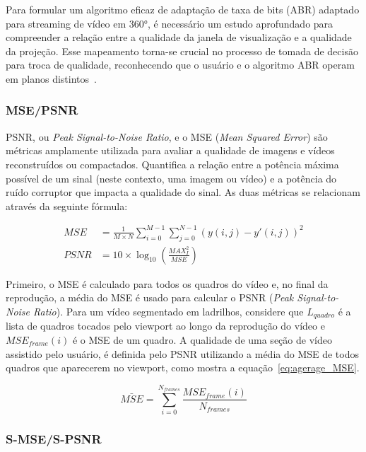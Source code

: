 Para formular um algoritmo eficaz de adaptação de taxa de bits (ABR) adaptado para streaming de vídeo em 360°, é necessário um estudo aprofundado para compreender a relação entre a qualidade da janela de visualização e a qualidade da projeção. Esse mapeamento torna-se crucial no processo de tomada de decisão para troca de qualidade, reconhecendo que o usuário e o algoritmo ABR operam em planos distintos~\cite{tran2017, Xu2020}.

\subsubsection{MSE/PSNR}

PSNR, ou \textit{Peak Signal-to-Noise Ratio}, e o MSE (\textit{Mean Squared Error}) são métricas amplamente utilizada para avaliar a qualidade de imagens e vídeos reconstruídos ou compactados. Quantifica a relação entre a potência máxima possível de um sinal (neste contexto, uma imagem ou vídeo) e a potência do ruído corruptor que impacta a qualidade do sinal. As duas métricas se relacionam através da seguinte fórmula:

\begin{align}
        \label{MSE}
        MSE&= \frac{1}{M\times N}\sum^{M-1}_{i=0}\sum^{N-1}_{j=0} \left(y(i,j) - y'(i,j)\right)^2 \\
        \label{PSNR}
        PSNR&=10 \times \log_{10}\left(\frac{MAX^2_I}{MSE}\right)
\end{align}

Primeiro, o MSE é calculado para todos os quadros do vídeo e, no final da reprodução, a média do MSE é usado para calcular o PSNR (\textit{Peak Signal-to-Noise Ratio}). Para um vídeo segmentado em ladrilhos, considere que $L_{quadro} $ é a lista de quadros tocados pelo viewport ao longo da reprodução do vídeo e $MSE_{frame}(i)$ é o MSE de um quadro. A qualidade de uma seção de vídeo assistido pelo usuário, é definida pelo PSNR utilizando a média do MSE de todos quadros que aparecerem no viewport, como mostra a equação~\ref{eq:agerage_MSE}.

\begin{equation}
        \bar{MSE} = \sum^{N_{frames}}_{i=0} \dfrac{MSE_{frame}(i)}{N_{frames}}
        \label{eq:agerage_MSE}
\end{equation}

\subsubsection{S-MSE/S-PSNR}

